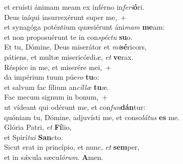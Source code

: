 \evenverse et eruísti ánimam meam ex inférno in\textit{fe}\textit{ri}\textbf{ó}ri.\\
\oddverse Deus iníqui insurrexérunt super me,~+\\
\oddverse  et synagóga poténtium quæsiérunt áni\textit{mam} \textbf{me}am:~\*\\
\oddverse et non proposuérunt te in con\textit{spé}\textit{ctu} \textbf{su}o.\\
\evenverse Et tu, Dómine, Deus miserátor et \textit{mi}\textbf{sé}ricors,~\*\\
\evenverse pátiens, et multæ misericórdi\textit{æ}, \textit{et} \textbf{ve}rax.\\
\oddverse Réspice in me, et miserére mei,~+\\
\oddverse  da impérium tuum púe\textit{ro} \textbf{tu}o:~\*\\
\oddverse et salvum fac fílium an\textit{cíl}\textit{læ} \textbf{tu}æ.\\
\evenverse Fac mecum signum in bonum,~+\\
\evenverse  ut vídeant qui odérunt me, et con\textit{fun}\textbf{dán}tur:~\*\\
\evenverse quóniam tu, Dómine, adjuvísti me, et conso\textit{lá}\textit{tus} \textbf{es} me.\\
\oddverse Glória Patri, \textit{et} \textbf{Fí}lio,~\*\\
\oddverse et Spirí\textit{tu}\textit{i} \textbf{San}cto.\\
\evenverse Sicut erat in princípio, et nunc, \textit{et} \textbf{sem}per,~\*\\
\evenverse et in sǽcula sæcu\textit{ló}\textit{rum}. \textbf{A}men.\\
